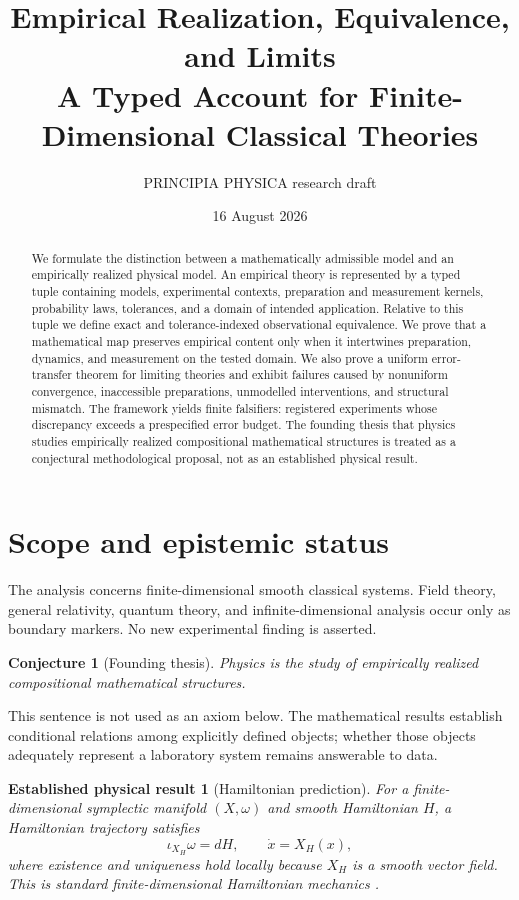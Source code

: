 \documentclass[11pt]{article}
\title{Empirical Realization, Equivalence, and Limits\\
\large A Typed Account for Finite-Dimensional Classical Theories}
\author{PRINCIPIA PHYSICA research draft}
\date{16 August 2026}
\newtheorem{conjecture}[definition]{Conjecture}
\newtheorem{established}[definition]{Established physical result}
\begin{document}
\maketitle

\begin{abstract}
We formulate the distinction between a mathematically admissible model and an empirically realized physical model.  An empirical theory is represented by a typed tuple containing models, experimental contexts, preparation and measurement kernels, probability laws, tolerances, and a domain of intended application.  Relative to this tuple we define exact and tolerance-indexed observational equivalence.  We prove that a mathematical map preserves empirical content only when it intertwines preparation, dynamics, and measurement on the tested domain.  We also prove a uniform error-transfer theorem for limiting theories and exhibit failures caused by nonuniform convergence, inaccessible preparations, unmodelled interventions, and structural mismatch.  The framework yields finite falsifiers: registered experiments whose discrepancy exceeds a prespecified error budget.  The founding thesis that physics studies empirically realized compositional mathematical structures is treated as a conjectural methodological proposal, not as an established physical result.
\end{abstract}

\section{Scope and epistemic status}

The analysis concerns finite-dimensional smooth classical systems.  Field theory, general relativity, quantum theory, and infinite-dimensional analysis occur only as boundary markers.  No new experimental finding is asserted.

\begin{conjecture}[Founding thesis]
Physics is the study of empirically realized compositional mathematical structures.
\end{conjecture}

This sentence is not used as an axiom below.  The mathematical results establish conditional relations among explicitly defined objects; whether those objects adequately represent a laboratory system remains answerable to data.

\begin{established}[Hamiltonian prediction]
For a finite-dimensional symplectic manifold $(X,\omega)$ and smooth Hamiltonian $H$, a Hamiltonian trajectory satisfies
\[
 \iota_{X_H}\omega=dH,\qquad \dot x=X_H(x),
\]
where existence and uniqueness hold locally because $X_H$ is a smooth vector field.  This is standard finite-dimensional Hamiltonian mechanics \cite{AbrahamMarsden1978,MarsdenRatiu1999}.
\end{established}
\end{document}
